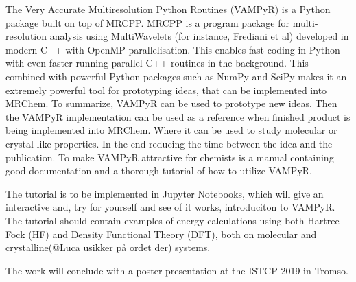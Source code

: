 \documentclass[12pt]{article}
\begin{document}
The Very Accurate Multiresolution Python Routines (VAMPyR\cite{vampyr})
is a Python package built on top of MRCPP\cite{mrcpp}. MRCPP is a program
package for multi-resolution analysis using MultiWavelets
(for instance, Frediani et al\cite{frediani2013fully})
developed in modern C++ with OpenMP parallelisation.
This enables fast coding in Python with even faster
running parallel C++ routines in the background. This combined with
powerful Python packages such as NumPy\cite{numpy} and SciPy\cite{SciPy}
makes it an extremely powerful tool for prototyping ideas, that can be implemented
into MRChem\cite{mrchem}. To summarize, VAMPyR can be used to prototype
new ideas. Then the VAMPyR implementation can be used as a reference when
finished product is being implemented into MRChem\cite{mrchem}. Where it can
be used to study molecular or crystal like properties. In the end reducing
the time between the idea and the publication. To make VAMPyR attractive
for chemists is a manual containing good documentation and a thorough tutorial
of how to utilize VAMPyR.

The tutorial is to be implemented in Jupyter Notebooks, which will
give an interactive and, try for yourself and see of it works,
introduciton to VAMPyR.
The tutorial should contain examples of energy calculations using
both Hartree-Fock (HF) and Density Functional Theory (DFT), both on
molecular and crystalline(@Luca usikker på ordet der) systems.

The work will conclude with a poster presentation at the ISTCP
2019\cite{istcp} in Tromso.




\end{document}
